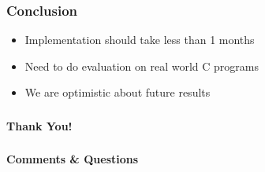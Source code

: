 \documentclass[xcolor=dvipsnames]{beamer}
\begin{document}
\begin{frame}
  \frametitle{Conclusion} {
   \Large
	\begin{itemize}
	\item Implementation should take less than 1 months
	\vspace{0.5cm}
	\item Need to do evaluation on real world C programs
	\vspace{0.5cm}	
	\item We are optimistic about future results
	\end{itemize}   
	}
\end{frame}

\begin{frame}
  \frametitle{} {\LARGE
\begin{center}
\textbf{Thank You!}
\end{center}
}
\end{frame}

\begin{frame}
  \frametitle{} {\LARGE
\begin{center}
\textbf{Comments \& Questions}
\end{center}
}
\end{frame}
\end{document}
